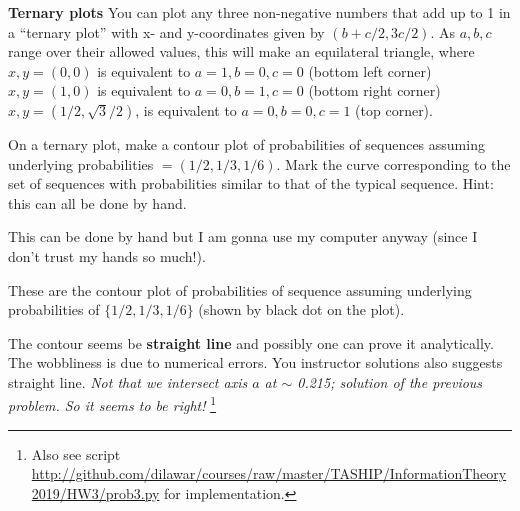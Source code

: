 \documentclass[twocolumns, answers]{exam}
\begin{document}
\begin{questions}
\bonusquestion[10] \textbf{Ternary plots}
You can plot any three non-negative numbers that add up to 1 in a “ternary plot” with
x- and y-coordinates given by $(b + c/2, 3c/2)$. As $a, b, c$ range over their
allowed values, this will make an equilateral triangle,
where $x, y = (0,0)$ is equivalent to ${a = 1, b = 0, c = 0}$ (bottom left corner)
$x, y = (1,0)$ is equivalent to ${a = 0, b = 1, c = 0}$ (bottom right corner)
$x, y =(1/2, \sqrt{3}/2)$, is equivalent to ${a = 0, b = 0, c = 1}$ (top
corner).

On a ternary plot, make a contour plot of probabilities of sequences assuming
underlying probabilities $=(1/2,1/3,1/6)$. Mark the curve corresponding to the
set of sequences with probabilities similar to that of the typical sequence.
Hint: this can all be done by hand.

\begin{solution}
    This can be done by hand but I am gonna use my computer anyway (since I
    don't trust my hands so much!).


    These are the contour plot of probabilities of sequence assuming underlying
    probabilities of $\{1/2, 1/3, 1/6\}$ (shown by black dot on the plot).

    The contour seems be \textbf{straight line} and possibly one can prove it
    analytically. The wobbliness is due to numerical errors.
    You instructor solutions also suggests straight line.
    \emph{Not that we intersect axis $a$ at $\sim$ 0.215; solution of the
    previous problem. So it seems to be right!}
    \footnote{Also see script
    \url{http://github.com/dilawar/courses/raw/master/TASHIP/InformationTheory2019/HW3/prob3.py}
    for implementation.}

\end{solution}
\end{questions}
\end{document}
